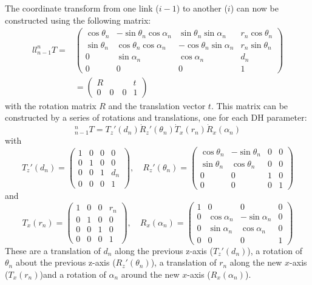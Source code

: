 The coordinate transform from one link ($ i-1$) to another ($i$) can now be constructed  using the following matrix:
\begin{eqnarray}{ll}
\nonumber
_{n-1}^nT=&
\left(
\begin{array}{ccc|c}
\cos \theta_n & -\sin \theta_n \cos\alpha_n & \sin\theta_n \sin\alpha_n & r_n \cos\theta_n\\
\sin \theta_n & \cos\theta_n \cos\alpha_n & -\cos\theta_n\sin\alpha_n & r_n \sin\theta_n\\
0 & \sin\alpha_n & \cos\alpha_n & d_n\\
\hline
0 & 0 & 0 & 1
\end{array}
\right)\\
&=
\left(
\begin{array}{c|c}
R & t\\
\hline
0 \quad 0 \quad 0 & 1
\end{array}
\right)
\end{eqnarray}
with the rotation matrix $R$ and the translation vector $t$. This matrix can be constructed by a series of rotations and translations, one for each DH parameter:
\begin{equation}
_{n-1}^nT=T_z'(d_n)\dot R_z'(\theta_n) \dot T_x(r_n) \dot R_x(\alpha_n)
\end{equation}
with
\begin{equation}
T_z'(d_n)=
\left(
\begin{array}{ccc|c}
1 & 0 & 0 & 0\\
0 & 1 & 0 & 0\\
0 & 0 & 1 & d_n\\
\hline
0 & 0 & 0 & 1
\end{array}
\right),
\quad
R_z'(\theta_n)=\left(
\begin{array}{ccc|c}
\cos\theta_n & -\sin\theta_n & 0 & 0\\
\sin\theta_n & \cos\theta_n & 0 & 0\\
0 & 0 & 1 & 0\\
\hline
0 & 0 & 0 & 1
\end{array}
\right)
\end{equation}
and
\begin{equation}
T_x(r_n)=
\left(
\begin{array}{ccc|c}
1 & 0 & 0 & r_n\\
0 & 1 & 0 & 0\\
0 & 0 & 1 & 0\\
\hline
0 & 0 & 0 & 1
\end{array}
\right),
\quad
R_x(\alpha_n)=\left(
\begin{array}{ccc|c}
1 & 0 & 0 & 0\\
0 & \cos\alpha_n & -\sin\alpha_n & 0\\
0 & \sin\alpha_n & \cos\alpha_n & 0\\
\hline
0 & 0 & 0 & 1
\end{array}
\right)
\end{equation} 
These are a translation of $d_n$ along the previous z-axis ($T_z'(d_n)$), a rotation of $\theta_n$ about the previous z-axis ($R_z'(\theta_n)$), a translation of $r_n$ along the new $x$-axis ($T_x(r_n)$)and a rotation of $\alpha_n$ around the new $x$-axis ($R_x(\alpha_n)$).

